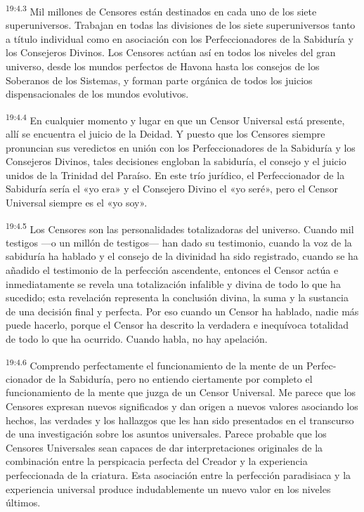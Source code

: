 \par
\textsuperscript{19:4.3} Mil millones de Censores están destinados en cada uno de los siete superuniversos. Trabajan en todas las divisiones de los siete superuniversos tanto a título individual como en asociación con los Perfeccionadores de la Sabiduría y los Consejeros Divinos. Los Censores actúan así en todos los niveles del gran universo, desde los mundos perfectos de Havona hasta los consejos de los Soberanos de los Sistemas, y forman parte orgánica de todos los juicios dispensacionales de los mundos evolutivos.

\par
\textsuperscript{19:4.4} En cualquier momento y lugar en que un Censor Universal está presente, allí se encuentra el juicio de la Deidad. Y puesto que los Censores siempre pronuncian sus veredictos en unión con los Perfeccionadores de la Sabiduría y los Consejeros Divinos, tales decisiones engloban la sabiduría, el consejo y el juicio unidos de la Trinidad del Paraíso. En este trío jurídico, el Perfeccionador de la Sabiduría sería el «yo era» y el Consejero Divino el «yo seré», pero el Censor Universal siempre es el «yo soy».

\par
\textsuperscript{19:4.5} Los Censores son las personalidades totalizadoras del universo. Cuando mil testigos ---o un millón de testigos--- han dado su testimonio, cuando la voz de la sabiduría ha hablado y el consejo de la divinidad ha sido registrado, cuando se ha añadido el testimonio de la perfección ascendente, entonces el Censor actúa e inmediatamente se revela una totalización infalible y divina de todo lo que ha sucedido; esta revelación representa la conclusión divina, la suma y la sustancia de una decisión final y perfecta. Por eso cuando un Censor ha hablado, nadie más puede hacerlo, porque el Censor ha descrito la verdadera e inequívoca totalidad de todo lo que ha ocurrido. Cuando habla, no hay apelación.

\par
\textsuperscript{19:4.6} Comprendo perfectamente el funcionamiento de la mente de un Perfec-cionador de la Sabiduría, pero no entiendo ciertamente por completo el funcionamiento de la mente que juzga de un Censor Universal. Me parece que los Censores expresan nuevos significados y dan origen a nuevos valores asociando los hechos, las verdades y los hallazgos que les han sido presentados en el transcurso de una investigación sobre los asuntos universales. Parece probable que los Censores Universales sean capaces de dar interpretaciones originales de la combinación entre la perspicacia perfecta del Creador y la experiencia perfeccionada de la criatura. Esta asociación entre la perfección paradisiaca y la experiencia universal produce indudablemente un nuevo valor en los niveles últimos.


